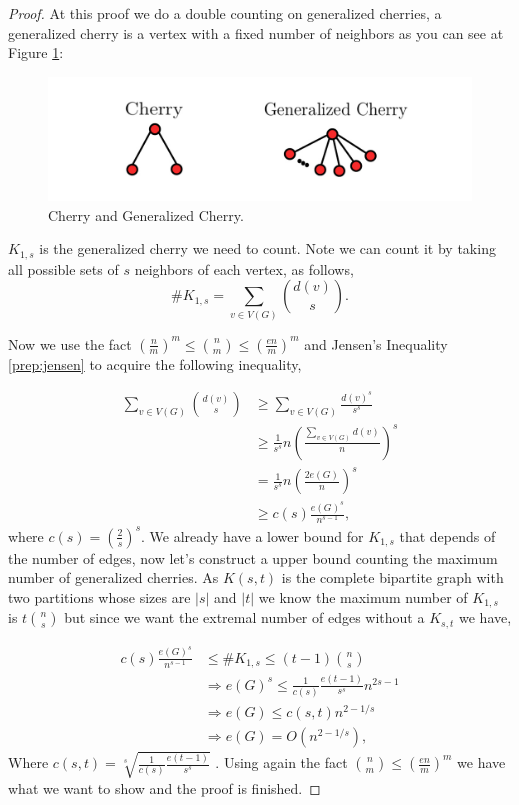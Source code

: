 \documentclass[12pt,twoside,a4paper]{book}
\numberwithin{equation}{section}
\theoremstyle{remark}
\begin{document}
\begin{proof}

At this proof we do a double counting on generalized cherries, a generalized cherry is a vertex with a fixed number of neighbors as you can see at Figure \ref{fig:generalizedcherry}:

\begin{figure}[!htb]
     \centering
     \includegraphics[scale=1]{Figuras/generalized-cherry.jpg}
     \caption{Cherry and Generalized Cherry.}
     \label{fig:generalizedcherry}
\end{figure}

$K_{1,s}$ is the generalized cherry we need to count. Note we can count it by taking all possible sets of $s$ neighbors of each vertex, as follows,
$$ \# K_{1,s} = \sum_{v \in V(G)} \binom{d(v)}{s} .$$

Now we use the fact $\left(\frac{n}{m}\right)^m \leq \binom{n}{m} \leq \left(\frac{en}{m}\right)^m$ and Jensen's Inequality \ref{prep:jensen} to acquire the following inequality,

\begin{align*} 
\sum_{v \in V(G)} \binom{d(v)}{s} & \geq \sum_{v \in V(G)}\frac{d(v)^s}{s^s}\\ 
& \geq \frac{1}{s^s} n \left( \frac{\sum_{v \in V(G)} d(v)}{n} \right) ^s \\
& = \frac{1}{s^s} n \left( \frac{ 2 e(G)}{n} \right) ^s \\
& \geq c(s) \frac{e(G)^s}{n^{s-1}},
\end{align*}
where $c(s) = \left(\frac{2}{s}\right)^s$.
We already have a lower bound for $K_{1,s}$ that depends of the number of edges, now let's construct a upper bound counting the maximum number of generalized cherries.
As $K(s,t)$ is the complete bipartite graph with two partitions whose sizes are $|s|$ and $|t|$ we know the maximum number of $K_{1,s}$ is $t\binom{n}{s}$ but since we want the extremal number of edges without a $K_{s,t}$ we have,

\begin{align*}
c(s) \frac{e(G)^s}{n^{s-1}} &\leq \# K_{1,s} \leq (t-1) \binom{n}{s}\\
		       & \Rightarrow e(G)^s \leq \frac{1}{c(s)}\frac{e(t-1)}{s^s}n^{2s-1}\\
		       &\Rightarrow e(G) \leq c(s,t) n^{2-1/s}\\
		       &\Rightarrow e(G) = O(n^{2-1/s}),
\end{align*}
Where $c(s,t)= \sqrt[s]{\frac{1}{c(s)}\frac{e(t-1)}{s^s}}$ . Using again the fact $\binom{n}{m} \leq \left(\frac{en}{m}\right)^m$ we have what we want to show and the proof is finished.
\end{proof}
\end{document}
